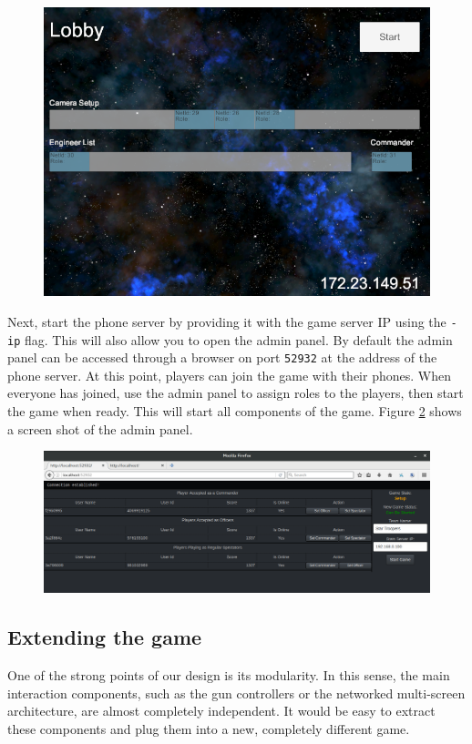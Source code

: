 \documentclass[a4paper,11pt]{article}
\begin{document}
\begin{figure}[ht]
  \centering
  \includegraphics[width=.7\textwidth]{game_lobby_screen}
  \label{fig:lobby_screen}
\end{figure}

Next, start the phone server by providing it with the game server IP using the \texttt{-ip} flag. This will also allow you to open the admin panel. By default the admin panel can be accessed through a browser on port \texttt{52932} at the address of the phone server. At this point, players can join the game with their phones. When everyone has joined, use the admin panel to assign roles to the players, then start the game when ready. This will start all components of the game. Figure \ref{fig:admin_panel} shows a screen shot of the admin panel.

\begin{figure}[ht]
	\centering
	\includegraphics[width=\textwidth]{images/admin_panel}
    \label{fig:admin_panel}
\end{figure}

\subsection{Extending the game}
One of the strong points of our design is its modularity. In this sense, the main interaction components, such as the gun controllers or the networked multi-screen architecture, are almost completely independent. It would be easy to extract these components and plug them into a new, completely different game.
\end{document}
